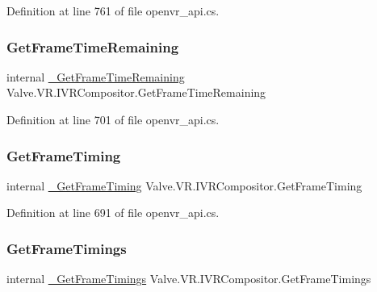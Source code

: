 Definition at line 761 of file openvr\+\_\+api.\+cs.

\mbox{\label{struct_valve_1_1_v_r_1_1_i_v_r_compositor_a16e7269af018b0589ede9e3d7d618487}} 
\subsubsection{\texorpdfstring{GetFrameTimeRemaining}{GetFrameTimeRemaining}}
{\footnotesize\ttfamily internal \mbox{\hyperlink{struct_valve_1_1_v_r_1_1_i_v_r_compositor_a946f8645a1cf6d6380064532df33d6d0}{\+\_\+\+Get\+Frame\+Time\+Remaining}} Valve.\+V\+R.\+I\+V\+R\+Compositor.\+Get\+Frame\+Time\+Remaining}



Definition at line 701 of file openvr\+\_\+api.\+cs.

\mbox{\label{struct_valve_1_1_v_r_1_1_i_v_r_compositor_ad2cdd4bf978eeda19961df5c88e424ce}} 
\subsubsection{\texorpdfstring{GetFrameTiming}{GetFrameTiming}}
{\footnotesize\ttfamily internal \mbox{\hyperlink{struct_valve_1_1_v_r_1_1_i_v_r_compositor_a6346b53c57bb41157b6fa9946537b334}{\+\_\+\+Get\+Frame\+Timing}} Valve.\+V\+R.\+I\+V\+R\+Compositor.\+Get\+Frame\+Timing}



Definition at line 691 of file openvr\+\_\+api.\+cs.

\mbox{\label{struct_valve_1_1_v_r_1_1_i_v_r_compositor_acbcbbcee7076791f10d650af68a95328}} 
\subsubsection{\texorpdfstring{GetFrameTimings}{GetFrameTimings}}
{\footnotesize\ttfamily internal \mbox{\hyperlink{struct_valve_1_1_v_r_1_1_i_v_r_compositor_a136355380a2308c5dc9f690b1ca77c60}{\+\_\+\+Get\+Frame\+Timings}} Valve.\+V\+R.\+I\+V\+R\+Compositor.\+Get\+Frame\+Timings}



